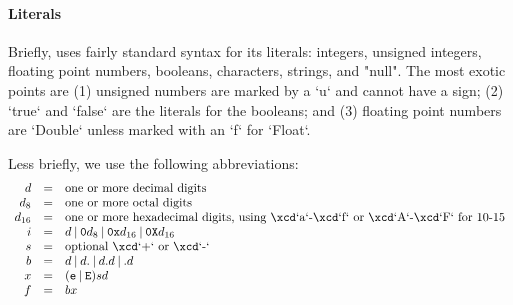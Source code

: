 \paragraph{Literals}\label{Literals}

Briefly, \XtenCurrVer{} uses fairly standard syntax for its literals:
integers, unsigned integers, floating point numbers, booleans, 
characters, strings, and \xcd"null".  The most exotic points are (1) unsigned
numbers are marked by a \xcd`u` and cannot have a sign; (2) \xcd`true` and
\xcd`false` are the literals for the booleans; and (3) floating point numbers
are \xcd`Double` unless marked with an \xcd`f` for \xcd`Float`. 

Less briefly, we use the following abbreviations: 
\begin{displaymath}
\begin{array}{rcll}
d &=& \mbox{one or more decimal digits}\\
d_8 &=& \mbox{one or more octal digits}\\
d_{16} &=& \mbox{one or more hexadecimal digits, using \xcd`a`-\xcd`f`
or \xcd`A`-\xcd`F`
for 10-15}\\
i &=& d 
        \mathbin{|} {\tt 0} d_8 
        \mathbin{|} {\tt 0x} d_{16}
        \mathbin{|} {\tt 0X} d_{16}
\\
s &=& \mbox{optional \xcd`+` or \xcd`-`}\\
b &=& d 
          \mathbin{|} d {\tt .}
          \mathbin{|} d {\tt .} d
          \mathbin{|}  {\tt .} d \\
x &=& ({\tt e } \mathbin{|} {\tt E})
         s
         d \\
f &=& b x
\end{array}
\end{displaymath}

